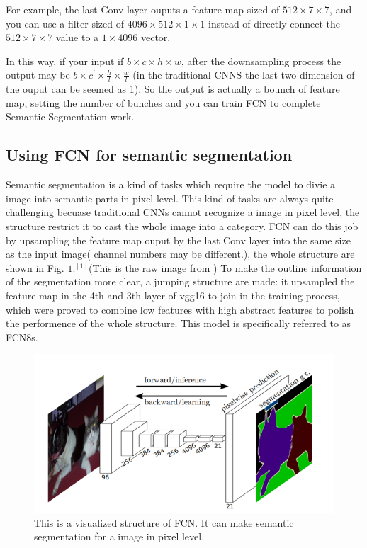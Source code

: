 \documentclass[transmag]{IEEEtran}
\begin{document}
  For example, the last Conv layer ouputs a feature map sized of $512 \times 7 \times 7$, and you can use a filter sized of $4096 \times 512 \times 1 \times 1$
  instead of directly connect the $512 \times 7 \times 7$ value to a $1 \times 4096$ vector.

  In this way, if your input if $ b \times c \times h \times w$, after the downsampling process the output may be $b \times c^{'} \times \frac{h}{l} \times \frac{w}{l}$ 
  (in the traditional CNNS the last two dimension of the ouput can be seemed as 1). So the output is actually a bounch of feature map, 
  setting the number of bunches and you can train FCN to complete Semantic Segmentation work.

\subsection{Using FCN for semantic segmentation}
  Semantic segmentation is a kind of tasks which require the model to divie a image into semantic parts in pixel-level. This kind of tasks
  are always quite challenging becuase traditional CNNs cannot recognize a image in pixel level, the structure restrict it to cast the whole
  image into a category. FCN can do this job by upsampling the feature map ouput by the last Conv layer into the same size as the input image(
    channel numbers may be different.), the whole structure are shown in Fig. $1.^{[1]}$(This is the raw image from \cite{1}) To make the 
    outline information of the segmentation more clear, a jumping structure are made: it upsampled the feature map in the 4th and 3th layer of 
    vgg16 to join in the training process, which were proved to combine low features with high abstract features to polish the performence of 
    the whole structure. This model is specifically referred to as FCN8s.


\begin{figure}
\centerline{\includegraphics[scale=0.5]{model_structure.PNG}}
\caption{This is a visualized structure of FCN. It can make semantic segmentation for a image in pixel level.\label{fig1}}
\end{figure}
\end{document}
